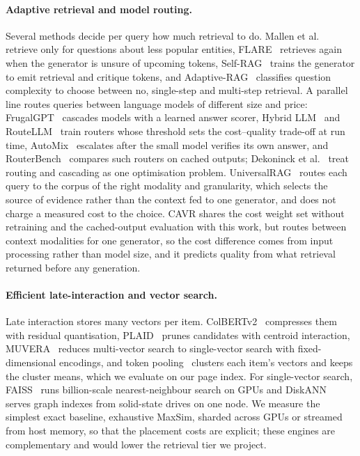 \paragraph{Adaptive retrieval and model routing.} Several methods decide per query how much retrieval to do.
Mallen et al.~\cite{mallen} retrieve only for questions about less popular entities, FLARE~\cite{flare} retrieves again when the
generator is unsure of upcoming tokens, Self-RAG~\cite{selfrag} trains the generator to emit retrieval and critique
tokens, and Adaptive-RAG~\cite{adaptiverag} classifies question complexity to choose between no, single-step and
multi-step retrieval. A parallel line routes queries between language models of different size and price:
FrugalGPT~\cite{frugalgpt} cascades models with a learned answer scorer, Hybrid LLM~\cite{hybridllm} and
RouteLLM~\cite{routellm} train routers whose threshold sets the cost--quality trade-off at run time,
AutoMix~\cite{automix} escalates after the small model verifies its own answer, and RouterBench~\cite{routerbench}
compares such routers on cached outputs; Dekoninck et al.~\cite{unifiedrouting} treat routing and cascading as
one optimisation problem. UniversalRAG~\cite{universalrag} routes each query to the corpus of the right modality and
granularity, which selects the source of evidence rather than the context fed to one generator, and does not charge
a measured cost to the choice. CAVR shares the cost weight set without retraining and the cached-output evaluation with
this work, but routes between context modalities for one generator, so the cost difference comes from input
processing rather than model size, and it predicts quality from what retrieval returned before any generation.

\paragraph{Efficient late-interaction and vector search.} Late interaction stores many vectors per item.
ColBERTv2~\cite{colbertv2} compresses them with residual quantisation, PLAID~\cite{plaid} prunes candidates with
centroid interaction, MUVERA~\cite{muvera} reduces multi-vector search to single-vector search with fixed-dimensional
encodings, and token pooling~\cite{tokenpooling} clusters each item's vectors and keeps the cluster means, which we
evaluate on our page index. For single-vector search, FAISS~\cite{faiss} runs billion-scale nearest-neighbour search on
GPUs and DiskANN~\cite{diskann} serves graph indexes from solid-state drives on one node. We measure the simplest exact baseline,
exhaustive MaxSim, sharded across GPUs or streamed from host memory, so that the placement costs are explicit; these
engines are complementary and would lower the retrieval tier we project.

